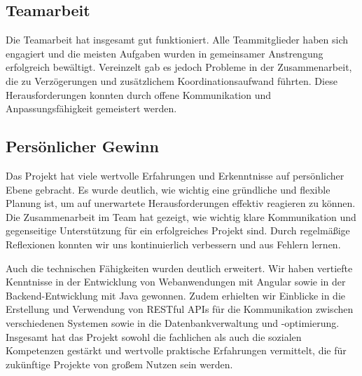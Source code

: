 \subsection*{Teamarbeit}

Die Teamarbeit hat insgesamt gut funktioniert. Alle Teammitglieder haben sich engagiert und die meisten Aufgaben wurden in gemeinsamer Anstrengung erfolgreich bewältigt. Vereinzelt gab es jedoch Probleme in der Zusammenarbeit, die zu Verzögerungen und zusätzlichem Koordinationsaufwand führten. Diese Herausforderungen konnten durch offene Kommunikation und Anpassungsfähigkeit gemeistert werden.

\subsection*{Persönlicher Gewinn}

Das Projekt hat viele wertvolle Erfahrungen und Erkenntnisse auf persönlicher Ebene gebracht. Es wurde deutlich, wie wichtig eine gründliche und flexible Planung ist, um auf unerwartete Herausforderungen effektiv reagieren zu können. Die Zusammenarbeit im Team hat gezeigt, wie wichtig klare Kommunikation und gegenseitige Unterstützung für ein erfolgreiches Projekt sind. Durch regelmäßige Reflexionen konnten wir uns kontinuierlich verbessern und aus Fehlern lernen. 

Auch die technischen Fähigkeiten wurden deutlich erweitert. Wir haben vertiefte Kenntnisse in der Entwicklung von Webanwendungen mit Angular sowie in der Backend-Entwicklung mit Java gewonnen. Zudem erhielten wir Einblicke in die Erstellung und Verwendung von RESTful APIs für die Kommunikation zwischen verschiedenen Systemen sowie in die Datenbankverwaltung und -optimierung. Insgesamt hat das Projekt sowohl die fachlichen als auch die sozialen Kompetenzen gestärkt und wertvolle praktische Erfahrungen vermittelt, die für zukünftige Projekte von großem Nutzen sein werden.
